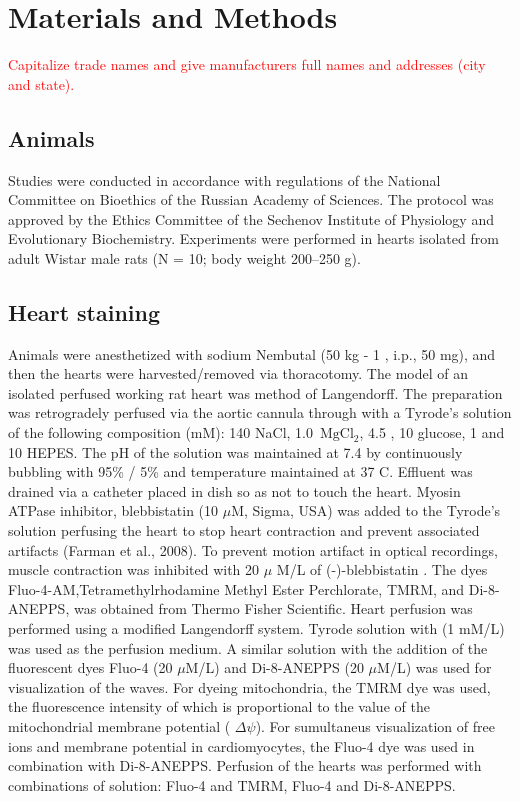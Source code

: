 \documentclass{biophys-new}
\begin{document}
\section*{Materials and Methods}

\textcolor{red}{Capitalize trade names and give manufacturers full names and addresses (city and state).}

\subsection*{Animals}

Studies were conducted in accordance with regulations of the National Committee on Bioethics of the Russian Academy of Sciences.
The protocol was approved by the Ethics Committee of the Sechenov Institute of Physiology and Evolutionary Biochemistry.
Experiments were performed in hearts isolated from adult Wistar male rats (N = 10; body weight 200–250 g).

\subsection*{Heart staining}

Animals were anesthetized with sodium Nembutal (50 kg - 1 , i.p., 50 mg), and then the hearts were harvested/removed via thoracotomy.
The model of an isolated perfused working rat heart was method of Langendorff.
The preparation was retrogradely perfused via the aortic cannula through with a Tyrode’s solution of the following composition (mM): 140 NaCl, 1.0 \(\,\mathrm{Mg}\mathrm{Cl}_2\), 4.5 , 10 glucose, 1  and 10 HEPES.
The pH of the solution was maintained at 7.4 by continuously bubbling with 95\% / 5\%  and temperature maintained at 37 C\degree.
Effluent was drained via a catheter placed in dish so as not to touch the heart.
Myosin ATPase inhibitor, blebbistatin (10 $\mu$M, Sigma, USA) was added to the Tyrode’s solution perfusing the heart to stop heart contraction and prevent associated artifacts (Farman et al., 2008).
To prevent motion artifact in optical recordings, muscle contraction was inhibited with 20 $\mu$ M/L of (-)-blebbistatin \cite{kong2014role}.
The dyes Fluo-4-AM,Tetramethylrhodamine Methyl Ester Perchlorate, TMRM, and Di-8-ANEPPS, was obtained from Thermo Fisher Scientific.
Heart perfusion was performed using a modified Langendorff system. Tyrode solution with  (1 mM/L) was used as the perfusion medium.
A similar solution with the addition of the fluorescent dyes Fluo-4 (20 $\mu$M/L) and Di-8-ANEPPS (20 $\mu$M/L) was used for visualization of the  waves.
For dyeing mitochondria, the TMRM dye was used, the fluorescence intensity of which is proportional to the value of the mitochondrial membrane potential ( $\Delta\psi$).
For sumultaneus visualization of free  ions and membrane potential in cardiomyocytes, the Fluo-4 dye was used in combination with Di-8-ANEPPS.
Perfusion of the hearts was performed with combinations of solution: Fluo-4 and TMRM, Fluo-4 and Di-8-ANEPPS.
\end{document}
